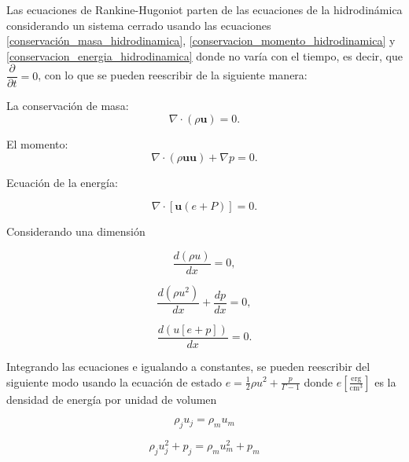\documentclass[12pt,a4paper]{book}
\begin{document}
Las ecuaciones de Rankine-Hugoniot parten de las ecuaciones de la hidrodinámica considerando un sistema cerrado usando las ecuaciones \ref{conservación_masa_hidrodinamica}, 
\ref{conservacion_momento_hidrodinamica} y \ref{conservacion_energia_hidrodinamica} donde no varía con el tiempo, es decir, que $\dfrac{\partial}{\partial t}=0$, con lo que se pueden reescribir de la siguiente manera:


\noindent La conservación de masa:
\begin{equation}
  \nabla \cdot \left( \rho \mathbf{u} \right)=0.
\end{equation}

\noindent El momento:
\begin{equation}
  \nabla \cdot \left( \rho \mathbf{u u} \right) + \nabla p = 0.
\end{equation}

\noindent Ecuación de la energía:

\begin{equation}
 \nabla \cdot \left[ \mathbf{u} \left( e+P \right) \right] = 0.
\end{equation}

Considerando una dimensión

\begin{equation}
\dfrac{d \left( \rho u \right)}{d x} = 0,
\end{equation}

\begin{equation}
\dfrac{d \left( \rho u^2 \right)}{d x}+ \dfrac{d p}{d x}=0,
\end{equation}

\begin{equation}
\dfrac{d \left( u\left[e +p \right] \right)}{d x} = 0.
\end{equation}

\noindent Integrando las ecuaciones e igualando a constantes, se pueden reescribir del siguiente modo usando la ecuación de estado $e = \frac{1}{2} \rho u^2 + \frac{p}{\Gamma-1}$ donde 
$e \left[\frac{\mathrm{erg}}{\mathrm{cm^3}}\right]$ 
es la densidad de energía por unidad de volumen

\begin{equation}\label{RH_masa}
\rho_j u_j = \rho_m u_m
\end{equation}

\begin{equation}\label{RH_momento}
\rho_j u_{j}^{2}+p_j = \rho_m u_{m}^{2}+p_m
\end{equation}
\end{document}
